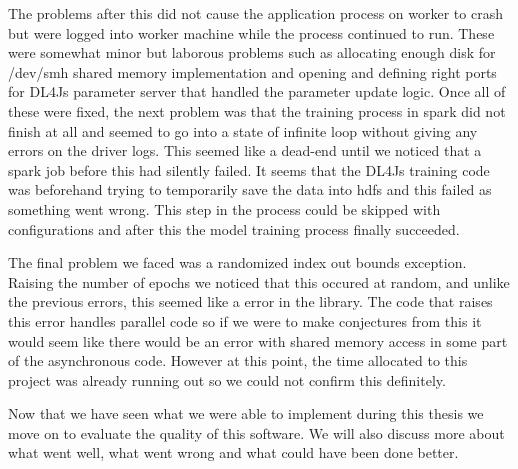 The problems after this did not cause the application process on worker to crash but were logged into worker machine while the process continued to run.
These were somewhat minor but laborous problems such as allocating enough disk for /dev/smh shared memory implementation and opening and defining right ports for DL4Js parameter server that handled the parameter update logic.
Once all of these were fixed, the next problem was that the training process in spark did not finish at all and seemed to go into a state of infinite loop without giving any errors on the driver logs.
This seemed like a dead-end until we noticed that a spark job before this had silently failed.
It seems that the DL4Js training code was beforehand trying to temporarily save the data into hdfs and this failed as something went wrong.
This step in the process could be skipped with configurations and after this the model training process finally succeeded.

The final problem we faced was a randomized index out bounds exception.
Raising the number of epochs we noticed that this occured at random, and unlike the previous errors, this seemed like a error in the library.
The code that raises this error handles parallel code so if we were to make conjectures from this it would seem like there would be an error with shared memory access in some part of the asynchronous code.
However at this point, the time allocated to this project was already running out so we could not confirm this definitely.

Now that we have seen what we were able to implement during this thesis we move on to evaluate the quality of this software.
We will also discuss more about what went well, what went wrong and what could have been done better.